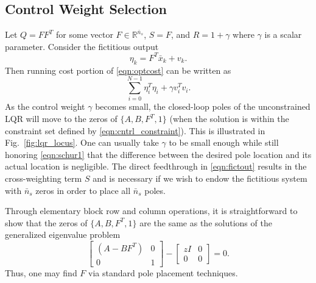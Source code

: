 \documentclass[twocolumn,twoside]{IEEEtran}
\newcommand{\xd}{\ensuremath{\bar x }\xspace}
\begin{document}
\subsection{Control Weight Selection}
Let $Q = FF^T$ for some vector $F\in\mathds{R}^{\bar{n}_s}$, $S=F$, and $R=1+\gamma$ where $\gamma$ is a scalar parameter. Consider the fictitious output
\begin{equation}
  \eta_k = F^T\xd_k + v_k. \label{eqn:fictout}
\end{equation}
Then running cost portion of \eqref{eqn:optcost} can be written as
\begin{equation}
   \sum_{i=0}^{N-1} \eta_i^T\eta_i + \gamma v_i^T v_i.
\end{equation}
As the control weight $\gamma$ becomes small, the closed-loop poles of the unconstrained LQR
will move to the zeros of $\{A, B, F^T, 1\}$ (when the solution is within the constraint set defined by \eqref{eqn:cntrl_constraint}). This is illustrated in Fig.~\ref{fig:lqr_locus}. One can usually take $\gamma$ to be small enough while still honoring \eqref{eqn:schur1}  that the difference between the desired pole location and its actual location is negligible. The direct feedthrough in \eqref{eqn:fictout} results in the cross-weighting term $S$ and is necessary if we wish to endow the fictitious system with $\bar{n}_s$ zeros in order to place all $\bar{n}_s$ poles.

Through elementary block row and column operations, it is straightforward to show that the zeros of
$\{A, B, F^T, 1\}$ are the same as the solutions of the generalized eigenvalue problem
\begin{equation}
  \begin{bmatrix}
    (A - BF^T) & 0\\
    0 & 1
  \end{bmatrix} - \begin{bmatrix}zI & 0\\0 & 0\end{bmatrix} = 0.
\end{equation}
Thus, one may find $F$ via standard pole placement techniques.
\end{document}
